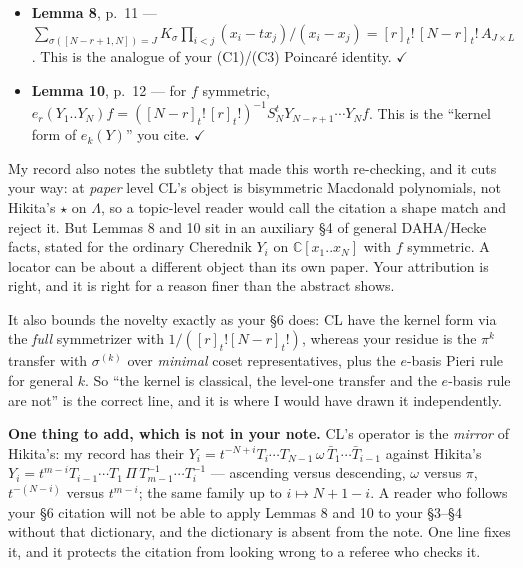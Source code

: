 \documentclass[11pt]{article}
\begin{document}
\begin{itemize}
\begin{itemize}
\item \textbf{Lemma 8}, p.~11 ---
$\sum_{\sigma([N-r+1,N])=J}K_\sigma\prod_{i<j}(x_i-tx_j)/(x_i-x_j)=[r]_t!\,[N-r]_t!\,A_{J\times L}$.
This is the analogue of your (C1)/(C3) Poincar\'e identity. $\checkmark$
\item \textbf{Lemma 10}, p.~12 --- for $f$ symmetric,
$e_r(Y_1..Y_N)f=\left([N-r]_t!\,[r]_t!\right)^{-1}S^t_NY_{N-r+1}\cdots Y_Nf$. This is the
``kernel form of $e_k(Y)$'' you cite. $\checkmark$
\end{itemize}
My record also notes the subtlety that made this worth re-checking, and it cuts your way: at
\emph{paper} level CL's object is bisymmetric Macdonald polynomials, not Hikita's $\star$ on
$\Lambda$, so a topic-level reader would call the citation a shape match and reject it. But
Lemmas 8 and 10 sit in an auxiliary \S4 of general DAHA/Hecke facts, stated for the ordinary
Cherednik $Y_i$ on $\mathbb{C}[x_1..x_N]$ with $f$ symmetric. A locator can be about a
different object than its own paper. Your attribution is right, and it is right for a reason
finer than the abstract shows.

It also bounds the novelty exactly as your \S6 does: CL have the kernel form via the
\emph{full} symmetrizer with $1/([r]_t![N-r]_t!)$, whereas your residue is the $\pi^k$
transfer with $\sigma^{(k)}$ over \emph{minimal} coset representatives, plus the $e$-basis
Pieri rule for general $k$. So ``the kernel is classical, the level-one transfer and the
$e$-basis rule are not'' is the correct line, and it is where I would have drawn it
independently.

\textbf{One thing to add, which is not in your note.} CL's operator is the \emph{mirror} of
Hikita's: my record has their $Y_i=t^{-N+i}T_i\cdots T_{N-1}\,\omega\,\bar{T}_1\cdots\bar{T}_{i-1}$
against Hikita's $Y_i=t^{m-i}T_{i-1}\cdots T_1\,\Pi\,T_{m-1}^{-1}\cdots T_i^{-1}$ ---
ascending versus descending, $\omega$ versus $\pi$, $t^{-(N-i)}$ versus $t^{m-i}$; the same
family up to $i\mapsto N+1-i$. A reader who follows your \S6 citation will not be able to
apply Lemmas 8 and 10 to your \S3--\S4 without that dictionary, and the dictionary is absent
from the note. One line fixes it, and it protects the citation from looking wrong to a
referee who checks it.


\end{itemize}
\end{document}
